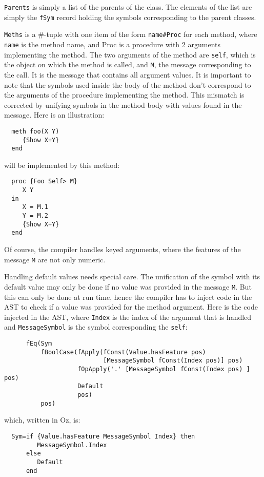 \documentclass[a4paper]{memoir}
\begin{document}
\lstinline!Parents! is simply a list of the parents of the class. The elements
of the list are simply the \lstinline!fSym! record holding the symbols corresponding to the
parent classes.

\lstinline!Meths! is a \#-tuple with one item of the form \lstinline!name#Proc! for each
method, where \lstinline!name! is the method name, and Proc is a procedure with
2 arguments implementing the method. The two arguments of the method are
\lstinline!self!,
which is the object on which the method is called, and \lstinline!M!, the message
corresponding to the call. It is the message that contains all argument values.
It is important to note that the symbols used inside the body of the method
don't correspond to the arguments of the procedure implementing the method.
This mismatch is corrected by unifying symbols in the method body with values
found in the message. Here is an illustration:
\begin{lstlisting}
  meth foo(X Y)
     {Show X+Y}
  end 
\end{lstlisting}
will be implemented by this method:
\begin{lstlisting}
  proc {Foo Self> M}
     X Y
  in
     X = M.1
     Y = M.2
     {Show X+Y}
  end  
\end{lstlisting}
Of course, the compiler handles keyed arguments, where the features of the
message \lstinline!M! are not only numeric.

Handling default values needs special care. The unification of the symbol with its default value may only be done
if no value was provided in the message \lstinline!M!. But this can only be done at run time, hence the compiler
has to inject code in the AST to check if a value was provided for the method argument.
Here is the code injected in the AST, where \lstinline!Index! is the index of the argument that is handled and 
\lstinline!MessageSymbol! is the symbol corresponding the \lstinline!self!:
\begin{lstlisting}
      fEq(Sym 
          fBoolCase(fApply(fConst(Value.hasFeature pos) 
                           [MessageSymbol fConst(Index pos)] pos)
                    fOpApply('.' [MessageSymbol fConst(Index pos) ] pos)
                    Default 
                    pos) 
          pos)
\end{lstlisting}
which, written in Oz, is:
\begin{lstlisting}
  Sym=if {Value.hasFeature MessageSymbol Index} then 
         MessageSymbol.Index 
      else
         Default
      end
\end{lstlisting}
\end{document}
